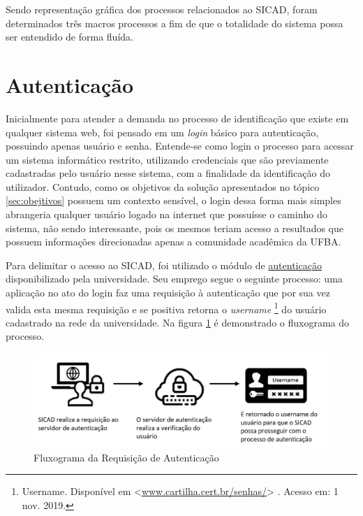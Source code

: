 \documentclass[12pt, a4paper]{report}
\begin{document}
Sendo representação gráfica dos processos relacionados ao \ac{SICAD}, foram determinados três macros processos a fim de que o totalidade do sistema possa ser entendido de forma fluída.


\section{ Autenticação}

Inicialmente para atender a demanda no processo de identificação que existe em qualquer sistema web, foi pensado em um \textit{login} básico para autenticação, possuindo apenas usuário e senha. Entende-se como login o processo para acessar um sistema informático restrito, utilizando credenciais que são previamente cadastradas pelo usuário nesse sistema, com a finalidade da identificação do utilizador. Contudo, como os objetivos da solução apresentados no tópico \ref{sec:obejtivos} possuem um contexto sensível, o login dessa forma mais simples abrangeria qualquer usuário logado na internet que possuísse o caminho do sistema, não sendo interessante, pois os mesmos teriam acesso a resultados que possuem informações direcionadas apenas a comunidade acadêmica da UFBA.

Para delimitar o acesso ao \ac{SICAD}, foi utilizado o módulo de \href{https://www.autenticacao.ufba.br}{autenticação} disponibilizado pela universidade. Seu emprego segue o seguinte processo: uma aplicação no ato do login faz uma requisição à autenticação que por sua vez valida esta mesma requisição e se positiva retorna o \textit{username} \footnote{Username. Disponível em <\url{www.cartilha.cert.br/senhas/}> . Acesso em: 1 nov. 2019.} do usuário cadastrado na rede da universidade. Na figura \ref{fig:processo_autenticacao} é demonstrado o fluxograma do processo.

\begin{figure}
\centering
\includegraphics[scale=0.50]{processo_autenticacao.jpg}
\caption{Fluxograma da Requisição de Autenticação}
\label{fig:processo_autenticacao}
\end{figure}
\end{document}
